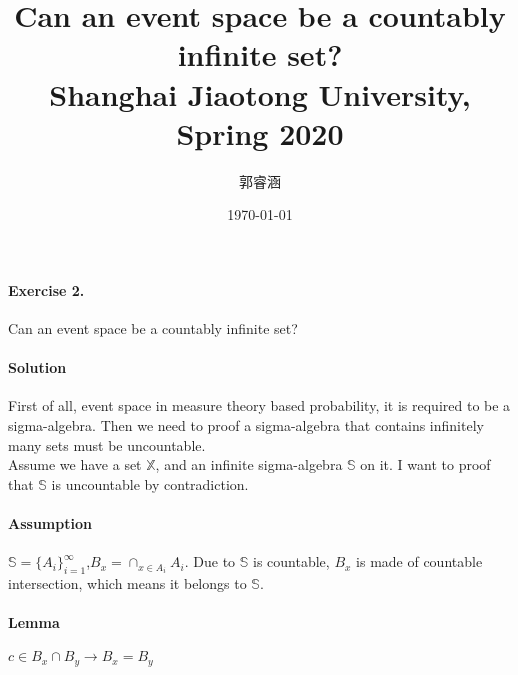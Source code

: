 \documentclass[UTF8]{ctexart}
\begin{document}
\author{郭睿涵}
\date{\today}

\title{Can an event space be a countably infinite set?\\
  \vspace{3mm}
{\large	Shanghai Jiaotong University, Spring 2020\\
}
}
\maketitle

\paragraph{Exercise 2.}Can an event space be a countably infinite set?
\paragraph{Solution}First of all, event space in measure theory based probability, it is required to be a sigma-algebra. Then we need to proof a sigma-algebra that contains infinitely many sets must be uncountable.\\
Assume we have a set $\mathbb{X}$, and an infinite sigma-algebra $\mathbb{S}$ on it. I want to proof that $\mathbb{S}$ is uncountable by contradiction.\\
\paragraph{Assumption} $\mathbb{S}=\{A_{i}\}_{i=1}^{\infty}$,$B_{x} =\cap_{x\in A_{i}}A_{i}$. Due to $\mathbb{S}$ is countable, $B_{x}$ is made of countable intersection, which means it belongs to $\mathbb{S}$.\\
\paragraph{Lemma} $c \in B_x \cap B_y \rightarrow B_x = B_y$
\end{document}
